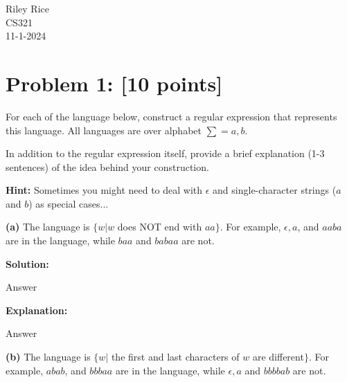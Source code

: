\documentclass[11pt, letterpaper]{article}
\begin{document}
\noindent Riley Rice\\CS321\\11-1-2024

\begin{center}\end{center}

\section*{Problem 1: [10 points]}

\noindent For each of the language below, construct a regular expression that represents this language. All languages are over alphabet $\sum = {a,b}$.

\vspace{5mm}

\noindent In addition to the regular expression itself, provide a brief explanation (1-3 sentences) of the idea behind your construction. 

\vspace{5mm}

\noindent\textbf{Hint:} Sometimes you might need to deal with $\epsilon$ and single-character strings ($a$ and $b$) as special cases...

\vspace{5mm}

\noindent \textbf{(a)} The language is $\{w | w$ does NOT end with $aa\}$. For example, $\epsilon, a$, and $aaba$ are in the language, while $baa$ and $babaa$ are not.

\vspace{5mm}

\noindent\textbf{Solution:}
 
\vspace {5mm}

\noindent Answer

\vspace {5mm}

\noindent \textbf{Explanation:}

\vspace{5mm}

\noindent Answer

\vspace{5mm}

\noindent \textbf{(b)} The language is $\{w |$  the first and last characters of $w$ are different$\}$. For example, $abab$, and $bbbaa$ are in the language, while $\epsilon, a$ and $bbbbab$ are not.

\vspace{5mm}
\end{document}
